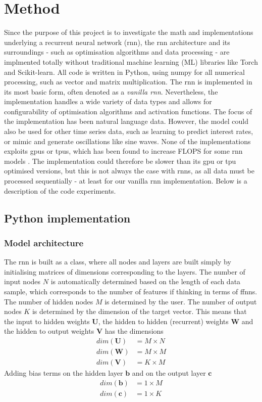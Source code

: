 \documentclass[12pt]{article}
\begin{document}
\section{Method}
Since the purpose of this project is to investigate the math and implementations underlying a recurrent neural network (\gls{rnn}), the \gls{rnn} architecture and its surroundings - such as optimisation algorithms and data processing - are implmented totally without traditional machine learning (ML) libraries like Torch and Scikit-learn. All code is written in Python, using numpy \cite{harrisArrayProgrammingNumPy2020} for all numerical processing, such as vector and matrix multiplication. The \gls{rnn} is implemented in its most basic form, often denoted as a \textit{vanilla \gls{rnn}}. Nevertheless, the implementation handles a wide variety of data types and allows for configurability of optimisation algorithms and activation functions. The focus of the implementation has been natural language data. However, the model could also be used for other time series data, such as learning to predict interest rates, or mimic and generate oscillations like sine waves. None of the implementations exploits \gls{gpu}s or \gls{tpu}s, which has been found to increase FLOPS for some \gls{rnn} models \cite{wang_benchmarking_2019}. The implementation could therefore be slower than its \gls{gpu} or \gls{tpu} optimised versions, but this is not always the case with \gls{rnn}s, as all data must be processed sequentially - at least for our vanilla \gls{rnn} implementation. Below is a description of the code experiments.

\subsection{Python implementation}

\subsubsection*{Model architecture}
The \gls{rnn} is built as a class, where all nodes and layers are built simply by initialising matrices of dimensions corresponding to the layers. The number of input nodes $N$ is automatically determined based on the length of each data sample, which corresponds to the number of features if thinking in terms of \gls{ffnn}s. The number of hidden nodes $M$ is determined by the user. The number of output nodes $K$ is determined by the dimension of the target vector. This means that the input to hidden weights $\mathbf{U}$, the hidden to hidden (recurrent) weights $\mathbf{W}$ and the hidden to output weights $\mathbf{V}$ has the dimensions
\begin{align*}
    dim(\mathbf{U}) &= M \times N \\
    dim(\mathbf{W}) &= M \times M \\
    dim(\mathbf{V}) &= K \times M
\end{align*}
Adding bias terms on the hidden layer $\mathbf{b}$ and on the output layer $\mathbf{c}$
\begin{align*}
    dim(\mathbf{b}) &= 1 \times M  \\
    dim(\mathbf{c}) &= 1 \times K
\end{align*}
\end{document}

